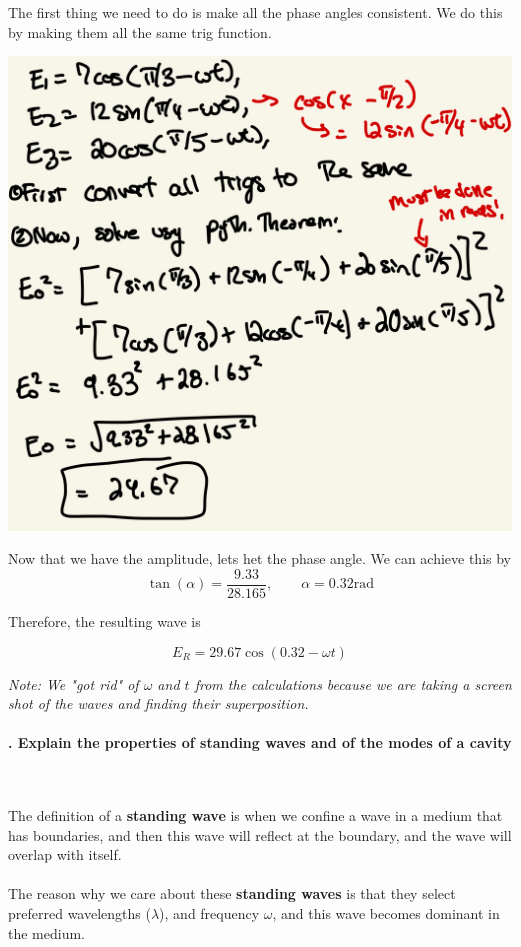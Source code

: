 \documentclass[10pt]{article}
\newcounter{counter}
\newcommand*{\question}[1]{
            \textbf{\thecounter. #1} \hfill
            \addtocounter{counter}{1}
            \\ \\
            }
\begin{document}
The first thing we need to do is make all the phase angles consistent. We do this by making them all the same trig function.

\begin{center}
    \includegraphics*[scale = .2]{imgs/superposition-example.jpeg}
\end{center}

Now that we have the amplitude, lets het the phase angle. We can achieve this by 
\[\tan(\alpha) = \frac{9.33}{28.165},\qquad \alpha = 0.32\text{rad}\]

Therefore, the resulting wave is 

\[\boxed{E_R = 29.67 \cos(0.32 - \omega t)} \]

\textit{Note: We "got rid" of $\omega$ and $t$ from the calculations because we are taking a screen shot of the waves and finding their superposition.}
\\ \\ 
\question{Explain the properties of standing waves and of the modes of a cavity}

The definition of a \textbf{standing wave} is when we confine a wave in a medium that has boundaries, and then this wave will reflect at the boundary, and the wave will overlap with itself. \\\\

The reason why we care about these \textbf{standing waves} is that they select preferred wavelengths ($\lambda$), and frequency $\omega$, and this wave becomes dominant in the medium. \\\\
\end{document}
